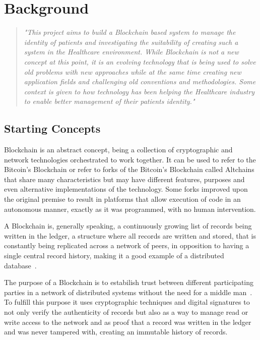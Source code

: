 \chapter{Background}\label{background}


\begin{quote} \emph{"This project aims to build a Blockchain based system to
  manage the identity of patients and investigating the suitability of creating
  such a system in the Healthcare environment.  While Blockchain is not a new
  concept at this point, it is an evolving technology that is being used to
  solve old problems with new approaches while at the same time creating new
  application fields and challenging old conventions and methodologies. Some
  context is given to how technology has been helping the Healthcare industry
  to enable better management of their patients identity."}
\end{quote}

\section{Starting Concepts}

Blockchain is an abstract concept, being a collection of cryptographic and
network technologies orchestrated to work together. It can be used to refer to
the Bitcoin's Blockchain or refer to forks of the Bitcoin's Blockchain called
Altchains~\cite{Lewis2015} that share many characteristics but may have
different features, purposes and even alternative implementations of the
technology. Some forks improved upon the original premise to result in
platforms that allow execution of code in an autonomous manner, exactly as it
was programmed, with no human intervention.

A Blockchain is, generally speaking, a continuously growing list of records
being written in the ledger, a structure where all records are written and
stored, that is constantly being replicated across a network of peers, in
opposition to having a single central record history, making it a good example
of a distributed database~\cite{Barclay2017}.

The purpose of a Blockchain is to estabilish trust between different
participating parties in a network of distributed systems without the need for
a middle man~\cite{Drescher2017}. To fulfill this purpose it uses cryptographic
techniques and digital signatures to not only verify the authenticity of
records but also as a way to manage read or write access to the network and as
proof that a record was written in the ledger and was never tampered with,
creating an immutable history of records.

